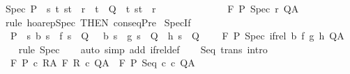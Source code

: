 \begin{isabellebody}
\isanewline
{}\isamarkupfalse%
\ Spec{\isacharcolon}\ {\isachardoublequoteopen}P\ {\isasymsubseteq}\ {\isacharbraceleft}s{\isachardot}\ {\isacharparenleft}{\isasymforall}t{\isachardot}\ {\isacharparenleft}s{\isacharcomma}t{\isacharparenright}\ {\isasymin}\ r\ {\isasymlongrightarrow}\ t\ {\isasymin}\ Q{\isacharparenright}\ {\isasymand}\ {\isacharparenleft}{\isasymexists}t{\isachardot}\ {\isacharparenleft}s{\isacharcomma}t{\isacharparenright}\ {\isasymin}\ r{\isacharparenright}{\isacharbraceright}\ \isanewline
\ \ \ \ \ \ \ \ \ \ \ \ {\isasymLongrightarrow}\ {\isasymGamma}{\isacharcomma}{\isasymTheta}{\isasymturnstile}\isactrlbsub {\isacharslash}F\isactrlesub \ P\ {\isacharparenleft}Spec\ r{\isacharparenright}\ Q{\isacharcomma}A{\isachardoublequoteclose}\isanewline
%
\isadelimproof
%
\endisadelimproof
%
\isatagproof
{}\isamarkupfalse%
\ {\isacharparenleft}rule\ hoarep{\isachardot}Spec\ {\isacharbrackleft}THEN\ conseqPre{\isacharbrackright}{\isacharparenright}%
\endisatagproof
{\isafoldproof}%
%
\isadelimproof
\isanewline
%
\endisadelimproof
\isanewline
{}\isamarkupfalse%
\ SpecIf{\isacharcolon}\ \isanewline
\ \ {\isachardoublequoteopen}{\isasymlbrakk}P\ {\isasymsubseteq}\ {\isacharbraceleft}s{\isachardot}\ {\isacharparenleft}b\ s\ {\isasymlongrightarrow}\ f\ s\ {\isasymin}\ Q{\isacharparenright}\ {\isasymand}\ {\isacharparenleft}{\isasymnot}\ b\ s\ {\isasymlongrightarrow}\ g\ s\ {\isasymin}\ Q\ {\isasymand}\ h\ s\ {\isasymin}\ Q{\isacharparenright}{\isacharbraceright}{\isasymrbrakk}\ {\isasymLongrightarrow}\isanewline
\ \ \ {\isasymGamma}{\isacharcomma}{\isasymTheta}{\isasymturnstile}\isactrlbsub {\isacharslash}F\isactrlesub \ P\ Spec\ {\isacharparenleft}if{\isacharunderscore}rel\ b\ f\ g\ h{\isacharparenright}\ Q{\isacharcomma}A{\isachardoublequoteclose}\isanewline
%
\isadelimproof
\ \ %
\endisadelimproof
%
\isatagproof
{}\isamarkupfalse%
\ {\isacharparenleft}rule\ Spec{\isacharparenright}\isanewline
\ \ \isamarkupfalse%
\ {\isacharparenleft}auto\ simp\ add{\isacharcolon}\ if{\isacharunderscore}rel{\isacharunderscore}def{\isacharparenright}\isanewline
\ \ \isamarkupfalse%
%
\endisatagproof
{\isafoldproof}%
%
\isadelimproof
\isanewline
%
\endisadelimproof
\isanewline
\isanewline
{}\isamarkupfalse%
\ Seq\ {\isacharbrackleft}trans{\isacharcomma}\ intro{\isacharquery}{\isacharbrackright}{\isacharcolon}\ \isanewline
\ \ {\isachardoublequoteopen}{\isasymlbrakk}{\isasymGamma}{\isacharcomma}{\isasymTheta}{\isasymturnstile}\isactrlbsub {\isacharslash}F\isactrlesub \ P\ c\ R{\isacharcomma}A{\isacharsemicolon}\ {\isasymGamma}{\isacharcomma}{\isasymTheta}{\isasymturnstile}\isactrlbsub {\isacharslash}F\isactrlesub \ R\ c\ Q{\isacharcomma}A{\isasymrbrakk}\ {\isasymLongrightarrow}\ {\isasymGamma}{\isacharcomma}{\isasymTheta}{\isasymturnstile}\isactrlbsub {\isacharslash}F\isactrlesub \ P\ {\isacharparenleft}Seq\ c\ c\ Q{\isacharcomma}A{\isachardoublequoteclose}\isanewline

\end{isabellebody}
